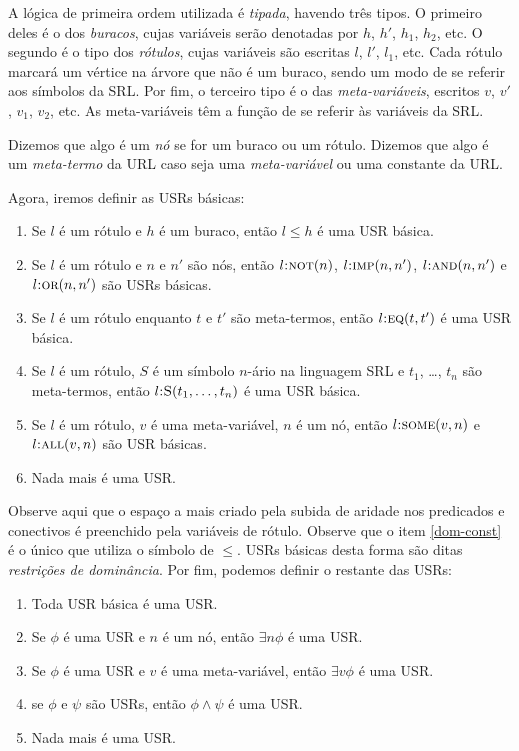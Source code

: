 A lógica de primeira ordem utilizada é \textit{tipada}, havendo três tipos. O primeiro deles é o dos \textit{buracos}, cujas variáveis serão denotadas por $h$, $h'$, $h_1$, $h_2$, etc. O segundo é o tipo dos \textit{rótulos}, cujas variáveis são escritas $l$, $l'$, $l_1$, etc. Cada rótulo marcará um vértice na árvore que não é um buraco, sendo um modo de se referir aos símbolos da SRL. Por fim, o terceiro tipo é o das \textit{meta-variáveis}, escritos $v$, $v'$, $v_1$, $v_2$, etc. As meta-variáveis têm a função de se referir às variáveis da SRL.

Dizemos que algo é um \textit{nó} se for um buraco ou um rótulo. Dizemos que algo é um \textit{meta-termo} da URL caso seja uma \textit{meta-variável} ou uma constante da URL.

Agora, iremos definir as USRs básicas:

\begin{enumerate}
\item Se $l$ é um rótulo e $h$ é um buraco, então $l \leq h$ é uma USR básica. \label{om-const}
\item Se $l$ é um rótulo e $n$ e $n'$ são nós, então $l\textsc{:not}(n)$, $l\textsc{:imp}(n,n')$, $l\textsc{:and}(n,n')$ e $l\textsc{:or}(n,n')$ são USRs básicas.
\item Se $l$ é um rótulo enquanto $t$ e $t'$ são meta-termos, então $l\textsc{:eq}(t,t')$ é uma USR básica.
\item Se $l$ é um rótulo, $S$ é um símbolo $n$-ário na linguagem SRL e $t_1$, \dots, $t_n$ são meta-termos, então $l\textsc{:S}(t_1,\dots, t_n)$ é uma USR básica.
\item Se $l$ é um rótulo, $v$ é uma meta-variável, $n$ é um nó,	então $l\textsc{:some}(v,n)$ e $l\textsc{:all}(v,n)$ são USR básicas.
\item Nada mais é uma USR.
\end{enumerate}

Observe aqui que o espaço a mais criado pela subida de aridade nos predicados e conectivos é preenchido pela variáveis de rótulo. Observe que o item \ref{dom-const} é o único que utiliza o símbolo de $\leq$. USRs básicas desta forma são ditas \textit{restrições de dominância}. Por fim, podemos definir o restante das USRs:

\begin{enumerate}
\item Toda USR básica é uma USR.
\item Se $\phi$ é uma USR e $n$ é um nó, então $\exists n \phi$ é uma USR.
\item Se $\phi$ é uma USR e $v$ é uma meta-variável, então $\exists v \phi$ é uma USR.
\item se $\phi$ e $\psi$ são USRs, então $\phi \land \psi$ é uma USR.
\item Nada mais é uma USR.
\end{enumerate}

